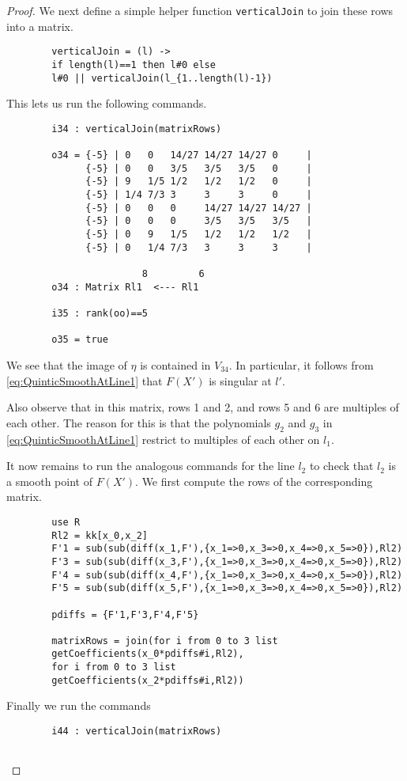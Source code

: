 \begin{proof}
	We next define a simple helper function \lstinline{verticalJoin} to join these rows into a matrix.
	\begin{verbatim}	
		verticalJoin = (l) ->
		if length(l)==1 then l#0 else
		l#0 || verticalJoin(l_{1..length(l)-1})
	\end{verbatim}
    This lets us run the following commands.
	\begin{verbatim}
		i34 : verticalJoin(matrixRows)
		
		o34 = {-5} | 0   0   14/27 14/27 14/27 0     |
		      {-5} | 0   0   3/5   3/5   3/5   0     |
		      {-5} | 9   1/5 1/2   1/2   1/2   0     |
		      {-5} | 1/4 7/3 3     3     3     0     |
		      {-5} | 0   0   0     14/27 14/27 14/27 |
		      {-5} | 0   0   0     3/5   3/5   3/5   |
		      {-5} | 0   9   1/5   1/2   1/2   1/2   |
		      {-5} | 0   1/4 7/3   3     3     3     |
		
		                8         6
		o34 : Matrix Rl1  <--- Rl1
		
		i35 : rank(oo)==5
		
		o35 = true
	\end{verbatim}
	We see that the image of $\eta$ is contained in $V_{34}$. In particular, it follows from \eqref{eq:QuinticSmoothAtLine1} that $F(X')$ is singular at $l'$.
	
	Also observe that in this matrix, rows 1 and 2, and rows 5 and 6 are multiples of each other. The reason for this is that the polynomials $g_2$ and $g_3$ in \eqref{eq:QuinticSmoothAtLine1} restrict to multiples of each other on $l_1$.
	
	It now remains to run the analogous commands for the line $l_2$ to check that $l_2$ is a smooth point of $F(X')$. We first compute the rows of the corresponding matrix.
	\begin{verbatim}
		use R
		Rl2 = kk[x_0,x_2]
		F'1 = sub(sub(diff(x_1,F'),{x_1=>0,x_3=>0,x_4=>0,x_5=>0}),Rl2)
		F'3 = sub(sub(diff(x_3,F'),{x_1=>0,x_3=>0,x_4=>0,x_5=>0}),Rl2)
		F'4 = sub(sub(diff(x_4,F'),{x_1=>0,x_3=>0,x_4=>0,x_5=>0}),Rl2)
		F'5 = sub(sub(diff(x_5,F'),{x_1=>0,x_3=>0,x_4=>0,x_5=>0}),Rl2)
		
		pdiffs = {F'1,F'3,F'4,F'5}
		
		matrixRows = join(for i from 0 to 3 list 
		getCoefficients(x_0*pdiffs#i,Rl2),
		for i from 0 to 3 list 
		getCoefficients(x_2*pdiffs#i,Rl2))
	\end{verbatim}
	Finally we run the commands
	\begin{verbatim}
		i44 : verticalJoin(matrixRows)
		

\end{verbatim}
\end{proof}
